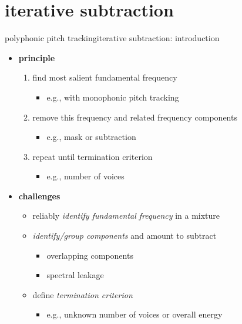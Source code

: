     \section[iterative subtraction]{iterative subtraction}
	\begin{frame}{polyphonic pitch tracking}{iterative subtraction: introduction}
        \vspace{-3mm}
        \begin{itemize}
            \item \textbf{principle}
                \smallskip
                \begin{enumerate}
                    \item	find most salient fundamental frequency 
                        \begin{itemize}
                            \item   e.g., with monophonic pitch tracking
                        \end{itemize}
                    \smallskip
                    \item<1->	remove this frequency and related frequency components
                        \begin{itemize}
                            \item   e.g., mask or subtraction
                        \end{itemize}
                    \smallskip
                    \item<1->	repeat until termination criterion
                        \begin{itemize}
                            \item   e.g., number of voices
                        \end{itemize}
                \end{enumerate}
            \bigskip
            \item<2->   \textbf{challenges}            
            \smallskip
            \begin{itemize}
                \item<2->	reliably \textit{identify fundamental frequency} in a mixture
                \smallskip
                \item<2->	\textit{identify/group components} and amount to subtract
                    \begin{itemize}
                        \item   overlapping components
                        \item   spectral leakage
                    \end{itemize}
                \smallskip
                \item<2->	define \textit{termination criterion}
                    \begin{itemize}
                        \item   e.g., unknown number of voices or overall energy
                    \end{itemize}
            \end{itemize}
        \end{itemize}
	\end{frame}
	
